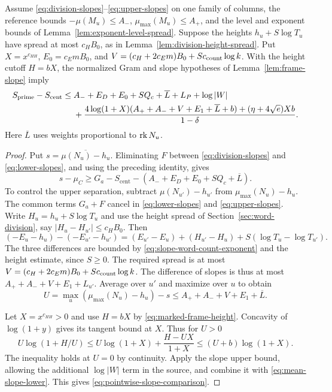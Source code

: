 \begin{proposition}\label{prop:fixed-point-slope-gap}
Assume \eqref{eq:division-slopes}--\eqref{eq:upper-slopes} on one
family of columns, the reference bounds \(-\mu(M_u)\le A_-\),
\(\mu_{\max}(M_u)\le A_+\), and the level and exponent bounds
of Lemma~\ref{lem:exponent-level-spread}. Suppose the heights
\(h_u+S\log T_u\) have spread at most \(c_HB_0\), as in
Lemma~\ref{lem:division-height-spread}. Put \(X=x^{c_{HH}}\),
\(E_0=c_E m B_0\), and \(V=(c_H+2c_E m)B_0+S c_{\rm count}\log k\).
With the height cutoff \(H=bX\), the normalized Gram and slope
hypotheses of Lemma~\ref{lem:frame-slope} imply
\begin{align}
 S_{\mathrm{prime}}-S_{\mathrm{cent}}\le{}&
 A_-+E_D+E_0+SQ_c+\overline L+L_P+\log|W| \notag\\
 &+\frac{4\log(1+X)(A_++A_-+V+E_1+\overline L+b)
               +(\eta+4\sqrt e)Xb}{1-\delta}.
 \label{eq:pointwise-slope-comparison}
\end{align}
Here \(\overline L\) uses weights proportional to \(\operatorname{rk} N_u\).
\end{proposition}

\begin{proof}
Put \(s=\overline{\mu(N_u)-h_u}\). Eliminating \(F\) between
\eqref{eq:division-slopes} and \eqref{eq:lower-slopes}, and using
the preceding identity, gives
\begin{equation}\label{eq:mean-slope-lower}
 s-\mu_C\ge G_a-S_{\mathrm{cent}}
           -(A_-+E_D+E_0+SQ_c+\overline L).
\end{equation}
To control the upper separation, subtract
\(\mu(N_{u'})-h_{u'}\) from \(\mu_{\max}(N_u)-h_u\).
The common terms \(G_a+F\) cancel in
\eqref{eq:lower-slopes} and \eqref{eq:upper-slopes}. Write
\(H_u=h_u+S\log T_u\) and use the height spread of
Section~\ref{sec:word-division}, say \(|H_u-H_{u'}|\le c_H B_0\).
Then
\[
 (-E_u-h_u)-(-E_{u'}-h_{u'})
  =(E_{u'}-E_u)+(H_{u'}-H_u)+S(\log T_u-\log T_{u'}).
\]
The three differences are bounded by \eqref{eq:slope-word-count-exponent}
and the height estimate, since \(S\ge0\). The required
spread is at most \(V=(c_H+2c_E m)B_0+S c_{\rm count}\log k\).
The difference of slopes is thus at most
\(A_++A_-+V+E_1+L_{u'}\). \label{cor:frames-6}
Average over \(u'\) and maximize over \(u\) to obtain
\[
 U=\max_u(\mu_{\max}(N_u)-h_u)-s
          \le A_++A_-+V+E_1+\overline L .
\]

Let \(X=x^{c_{HH}}>0\) and use \(H=bX\) by \eqref{eq:marked-frame-height}.
Concavity of \(\log(1+y)\) gives its tangent bound at \(X\).
Thus for \(U>0\)
\[
 U\log(1+H/U)
 \le U\log(1+X)+\frac{H-UX}{1+X}
 \le (U+b)\log(1+X).
\]
The inequality holds at \(U=0\) by continuity.
Apply the slope upper bound, allowing the additional
\(\log|W|\) term in the source, and combine it with
\eqref{eq:mean-slope-lower}. This gives \eqref{eq:pointwise-slope-comparison}.
\end{proof}

